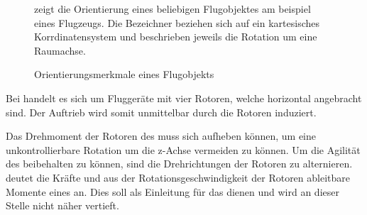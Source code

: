 








\begin{figure}[ht!]
\vspace{0.25cm}
\begin{center}
\caption{Orientierungsmerkmale eines Flugobjekts \cite{parotSDK}}
\label{fig:Orient}
\end{center}

\vspace{0.25cm}
 zeigt die Orientierung eines beliebigen Flugobjektes am beispiel eines Flugzeugs. Die Bezeichner beziehen sich auf ein kartesisches Korrdinatensystem und beschrieben jeweils die Rotation um eine Raumachse.
\end{figure}






Bei \Quad[n] handelt es sich um Fluggeräte mit vier Rotoren, welche horizontal angebracht sind. Der Auftrieb wird somit unmittelbar durch die Rotoren induziert.

Das Drehmoment der Rotoren des \Quad[s] muss sich aufheben können, um eine unkontrollierbare Rotation um die z-Achse vermeiden zu können. Um die Agilität des \Quad[s] beibehalten zu können, sind die Drehrichtungen der Rotoren zu alternieren.  deutet die Kräfte und aus der Rotationsgeschwindigkeit der Rotoren ableitbare Momente eines \Quad[s] an. Dies soll als Einleitung für das  dienen und wird an dieser Stelle nicht näher vertieft.

